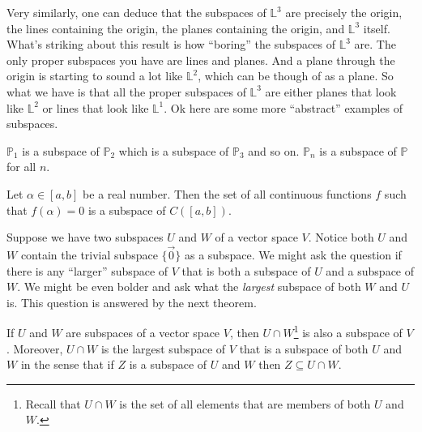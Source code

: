 Very similarly, one can deduce that the subspaces of $\mathbb{L}^3$ are precisely the origin, the lines containing the origin, the planes containing the origin, and $\mathbb{L}^3$ itself. What's striking about this result is how ``boring'' the subspaces of $\mathbb{L}^3$ are. The only proper subspaces you have are lines and planes. And a plane through the origin is starting to sound a lot like $\mathbb{L}^2$, which can be though of as a plane. So what we have is that all the proper subspaces of $\mathbb{L}^3$ are either planes that look like $\mathbb{L}^2$ or lines that look like $\mathbb{L}^1$. Ok here are some more ``abstract'' examples of subspaces. 

\begin{example}
	$\mathbb{P}_1$ is a subspace of $\mathbb{P}_2$ which is a subspace of $\mathbb{P}_3$ and so on. $\mathbb{P}_n$ is a subspace of $\mathbb{P}$ for all $n$.
\end{example}

\begin{example}
Let $\alpha \in [a,b]$ be a real number. Then the set of all continuous functions $f$ such that $f(\alpha) = 0$ is a subspace of $C([a,b])$.
\end{example}

Suppose we have two subspaces $U$ and $W$ of a vector space $V$. Notice both $U$ and $W$ contain the trivial subspace $\{\vec{0}\}$ as a subspace. We might ask the question if there is any ``larger'' subspace of $V$ that is both a subspace of $U$ and a subspace of $W$. We might be even bolder and ask what the \textit{largest} subspace of both $W$ and $U$ is. This question is answered by the next theorem.

\begin{theorem}
	If $U$ and $W$ are subspaces of a vector space $V$, then $U \cap W$\footnote{Recall that $U \cap W$ is the set of all elements that are members of both $U$ and $W$.} is also a subspace of $V$. Moreover, $U \cap W$ is the largest subspace of $V$ that is a subspace of both $U$ and $W$ in the sense that if $Z$ is a subspace of $U$ and $W$ then $Z \subseteq U \cap W$.
\end{theorem}

